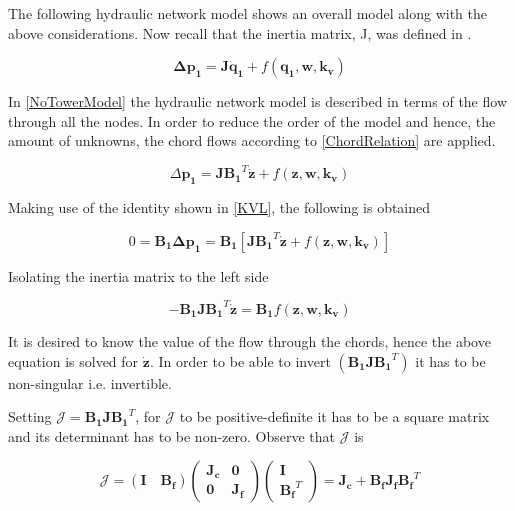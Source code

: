 The following hydraulic network model shows an overall model along with the above considerations. 
Now recall that the inertia matrix, J, was defined in .

\begin{equation}
  \pmb{\Delta p_1} =  \pmb{J} \pmb{\dot{q}_1} + f(\pmb{q_1}, \pmb{w}, \pmb{k_v})
  \label{NoTowerModel}
\end{equation}

In \eqref{NoTowerModel} the hydraulic network model is described in terms of the 
flow through all the nodes. In order to reduce the order of the model and hence, 
the amount of unknowns, the chord flows according to \eqref{ChordRelation} are applied. 

\begin{equation}
  \Delta \pmb{p_1} =  \pmb{J} {\pmb{B_1}}^T \pmb{\dot{z}} + f(\pmb{z}, \pmb{w}, \pmb{k_v})
  \label{ChordsModel}
\end{equation}

Making use of the identity shown in \eqref{KVL}, the following is obtained

\begin{equation}
  0 = \pmb{B_1} \pmb{\Delta p_1} = \pmb{B_1} [ \pmb{J {B_1}}^T \pmb{\dot{z}} + f(\pmb{z}, \pmb{w}, \pmb{k_v})] 
 \end{equation}

Isolating the inertia matrix to the left side

\begin{equation}
 - \pmb{B_1} \pmb{J} \pmb{{B_1}}^T \pmb{\dot{z}}  = \pmb{B_1} f(\pmb{z}, \pmb{w}, \pmb{k_v})
 \end{equation}

It is desired to know the value of the flow through the chords, hence the above equation is solved 
for $\pmb{\dot{z}}$. In order to be able to invert $(\pmb{B_1 J} \pmb{{B_1}}^T)$ it has to be non-singular i.e. invertible. 

Setting $\pmb{\mathcal{J}} = \pmb{B_1 J} \pmb{{B_1}}^T $, for $\pmb{\mathcal{J}}$ to be positive-definite it has to be a square matrix and its 
determinant has to be non-zero. Observe that $\pmb{\mathcal{J}}$ is

\begin{equation}
  \label{Jequation}
  \pmb{\mathcal{J}} = (\pmb{I \quad B_f}) 
  \begin{pmatrix}
    \pmb{J_c}    &    \pmb{0 }   \\
    \pmb{0}       &   \pmb{ J_f}
  \end{pmatrix}
  \begin{pmatrix}
    \pmb{I}    \\
    \pmb{{B_f}}^T
  \end{pmatrix}
  = \pmb{J_c} + \pmb{B_f J_f} \pmb{{B_f}}^T
\end{equation}

